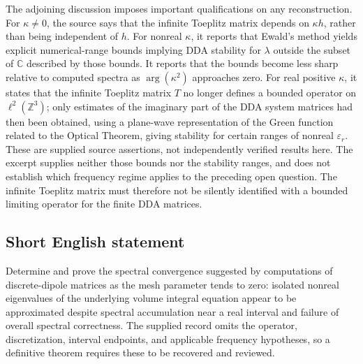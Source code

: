 \documentclass[11pt]{article}
\newcommand{\Z}{\mathbb{Z}}
\newcommand{\C}{\mathbb{C}}
\begin{document}
The adjoining discussion imposes important qualifications on any reconstruction. For \(\kappa\ne0\), the source says that the infinite Toeplitz matrix depends on \(\kappa h\), rather than being independent of \(h\). For nonreal \(\kappa\), it reports that Ewald's method yields explicit numerical-range bounds implying DDA stability for \(\lambda\) outside the subset of \(\C\) described by those bounds. It reports that the bounds become less sharp relative to computed spectra as \(\arg(\kappa^2)\) approaches zero. For real positive \(\kappa\), it states that the infinite Toeplitz matrix \(T\) no longer defines a bounded operator on \(\ell^2(\Z^3)\); only estimates of the imaginary part of the DDA system matrices had then been obtained, using a plane-wave representation of the Green function related to the Optical Theorem, giving stability for certain ranges of nonreal \(\varepsilon_r\). These are supplied source assertions, not independently verified results here. The excerpt supplies neither those bounds nor the stability ranges, and does not establish which frequency regime applies to the preceding open question. The infinite Toeplitz matrix must therefore not be silently identified with a bounded limiting operator for the finite DDA matrices.
\subsection{Short English statement}
Determine and prove the spectral convergence suggested by computations of discrete-dipole matrices as the mesh parameter tends to zero: isolated nonreal eigenvalues of the underlying volume integral equation appear to be approximated despite spectral accumulation near a real interval and failure of overall spectral correctness. The supplied record omits the operator, discretization, interval endpoints, and applicable frequency hypotheses, so a definitive theorem requires these to be recovered and reviewed.
\end{document}
